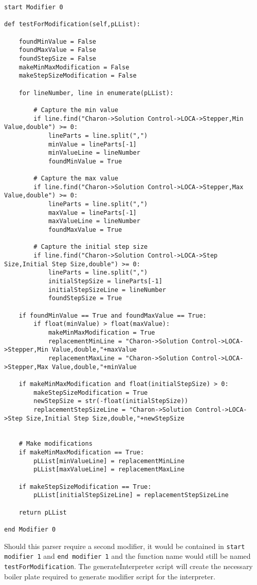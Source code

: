 \begin{lstlisting}
start Modifier 0

def testForModification(self,pLList):

    foundMinValue = False
    foundMaxValue = False
    foundStepSize = False
    makeMinMaxModification = False
    makeStepSizeModification = False
        
    for lineNumber, line in enumerate(pLList):

        # Capture the min value
        if line.find("Charon->Solution Control->LOCA->Stepper,Min Value,double") >= 0:
            lineParts = line.split(",")
            minValue = lineParts[-1]
            minValueLine = lineNumber
            foundMinValue = True

        # Capture the max value
        if line.find("Charon->Solution Control->LOCA->Stepper,Max Value,double") >= 0:
            lineParts = line.split(",")
            maxValue = lineParts[-1]
            maxValueLine = lineNumber
            foundMaxValue = True

        # Capture the initial step size
        if line.find("Charon->Solution Control->LOCA->Step Size,Initial Step Size,double") >= 0:
            lineParts = line.split(",")
            initialStepSize = lineParts[-1]
            initialStepSizeLine = lineNumber
            foundStepSize = True

    if foundMinValue == True and foundMaxValue == True:
        if float(minValue) > float(maxValue):
            makeMinMaxModification = True
            replacementMinLine = "Charon->Solution Control->LOCA->Stepper,Min Value,double,"+maxValue
            replacementMaxLine = "Charon->Solution Control->LOCA->Stepper,Max Value,double,"+minValue

    if makeMinMaxModification and float(initialStepSize) > 0:
        makeStepSizeModification = True
        newStepSize = str(-float(initialStepSize))
        replacementStepSizeLine = "Charon->Solution Control->LOCA->Step Size,Initial Step Size,double,"+newStepSize


    # Make modifications
    if makeMinMaxModification == True:
        pLList[minValueLine] = replacementMinLine
        pLList[maxValueLine] = replacementMaxLine

    if makeStepSizeModification == True:
        pLList[initialStepSizeLine] = replacementStepSizeLine

    return pLList

end Modifier 0
\end{lstlisting}
Should this parser require a second modifier, it would be contained in
\texttt{start modifier 1} and \texttt{end modifier 1} and the function
name would still be named \texttt{testForModification}.  The
generateInterpreter script will create the necessary boiler plate
required to generate modifier script for the interpreter.

